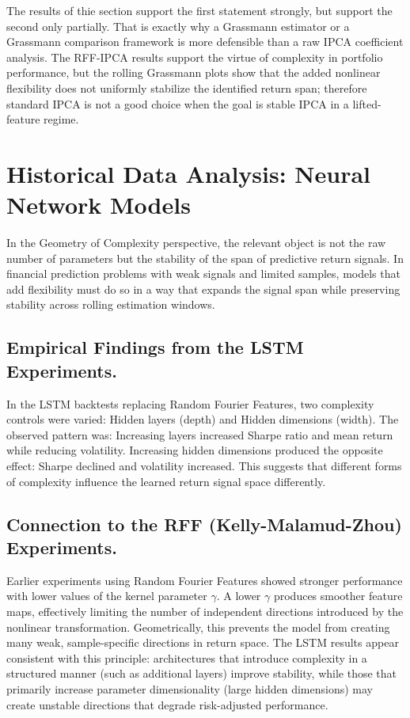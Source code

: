 \documentclass[twoside,11pt,letter]{article}
\begin{document}
The results of thie section support the first statement strongly, but support the second only partially. That is exactly why a Grassmann estimator or a Grassmann comparison framework is more defensible than a raw IPCA coefficient analysis. The RFF-IPCA results support the virtue of complexity in portfolio performance, but the rolling Grassmann plots show that the added nonlinear flexibility does not uniformly stabilize the identified return span; therefore standard IPCA is not a good choice when the goal is stable IPCA in a lifted-feature regime.


\section{Historical Data Analysis: Neural Network Models}

In the Geometry of Complexity perspective, the relevant object is not the raw number of parameters but the stability of the span of predictive return signals. In financial prediction problems with weak signals and limited samples, models that add flexibility must do so in a way that expands the signal span while preserving stability across rolling estimation windows.

\subsection{Empirical Findings from the LSTM Experiments.}

In the LSTM backtests replacing Random Fourier Features, two complexity controls were varied: Hidden layers (depth) and Hidden dimensions (width). The observed pattern was: Increasing layers increased Sharpe ratio and mean return while reducing volatility. Increasing hidden dimensions produced the opposite effect: Sharpe declined and volatility increased. This suggests that different forms of complexity influence the learned return signal space differently.

\subsection{Connection to the RFF (Kelly-Malamud-Zhou) Experiments.}

Earlier experiments using Random Fourier Features showed stronger performance with lower values of the kernel parameter $\gamma$. A lower $\gamma$ produces smoother feature maps, effectively limiting the number of independent directions introduced by the nonlinear transformation. Geometrically, this prevents the model from creating many weak, sample-specific directions in return space. The LSTM results appear consistent with this principle: architectures that introduce complexity in a structured manner (such as additional layers) improve stability, while those that primarily increase parameter dimensionality (large hidden dimensions) may create unstable directions that degrade risk-adjusted performance.
\end{document}
